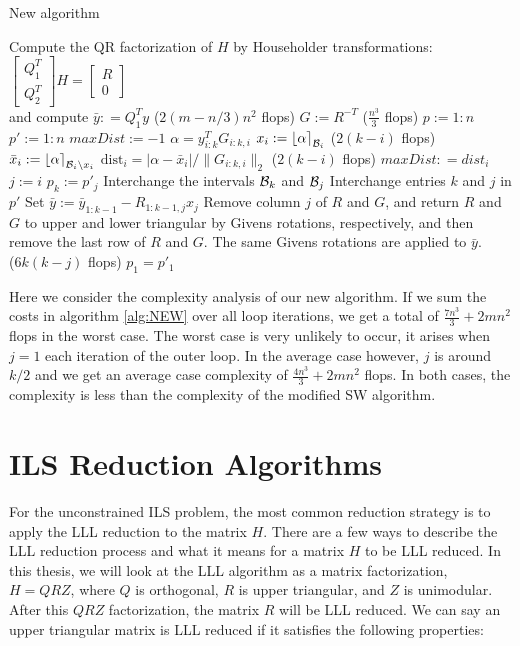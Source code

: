 \documentclass[12pt,Bold,letterpaper]{mcgilletdclass}
\newcommand{\bsmx}{\left[\begin{smallmatrix}}
\newcommand{\esmx}{\end{smallmatrix}\right]}
\newcommand{\dist}{\mathrm{dist}}
\begin{document}
\begin{algorithm}
\caption{New algorithm}
\label{alg:NEW}
\begin{algorithmic}[1]
\STATE  Compute the QR factorization of $H$ by Householder transformations: 
$\bsmx Q_1^T \\ Q_2^T \esmx H= \bsmx R\\ 0 \esmx$  \\
             and compute  $\bar{y} : = Q_1^Ty$ \hfill ($2(m-n/3)n^2$ flops)
\STATE $G := R^{-T}$ \hfill ($\frac{n^3}{3}$ flops)
\STATE $p := 1:n$
\STATE $p' := 1:n$
	\STATE $maxDist := -1$
	         \STATE $\alpha=y_{i:k}^TG_{i:k,i}$
	         \STATE $x_i := \left \lfloor \alpha \right \rceil_{{\cal B}_i}$ \hfill ($2(k-i)$ flops)
	         \STATE $\bar{x}_i := \left \lfloor \alpha \right \rceil_{{{\cal B}_i}\backslash x_i}$
	         \STATE $\dist_i =|\alpha-\bar{x}_i|/ \| G_{i:k,i} \|_2$ \hfill ($2(k-i)$ flops)
			 	\STATE $maxDist : = dist_i$
			 	\STATE $j:=i$
			 \ENDIF	
	\ENDFOR
	\STATE $p_k := p'_j$
	\STATE Interchange the intervals ${{\cal B}_k}$ and ${{\cal B}_j}$
	\STATE Interchange entries $k$ and $j$ in $p'$
	\STATE Set $\bar{y}:=\bar{y}_{1:k-1} - R_{1:k-1,j}x_j$	
	\STATE Remove column $j$ of $R$ and $G$, and return $R$ and $G$ to upper and lower triangular by Givens rotations, respectively, and then remove the last row of $R$ and $G$. The same Givens rotations are applied to $\bar{y}$. \\ \hfill ($6k(k-j)$ flops)
\ENDFOR
\STATE $p_1 = p'_1$
\end{algorithmic}
\end{algorithm}

Here we consider the complexity analysis of our new algorithm. 
If we sum the costs in algorithm \ref{alg:NEW} over all loop iterations,
we get a total of $\frac{7n^3}{3} + 2mn^2$ flops in the worst case. 
The worst case is very unlikely to occur, it arises when $j=1$ each iteration of the outer loop. In the average case
however, $j$ is around $k/2$ and we get an average case complexity of $\frac{4n^3}{3} + 2mn^2$ flops.
In both cases, the complexity is less than the complexity of the modified SW algorithm.

\section{ILS Reduction Algorithms}
For the unconstrained ILS problem, the most common reduction strategy is to apply the LLL reduction \cite{LenLL82} to the matrix $H$. There are a few ways to describe the LLL reduction process and what it means for a matrix $H$ to be LLL reduced. In this thesis, we will look at the LLL algorithm as a matrix factorization, $H = QRZ$, where $Q$ is orthogonal, $R$ is upper triangular, and $Z$ is unimodular. After this $QRZ$ factorization, the matrix $R$ will be LLL reduced. We can say an upper triangular matrix is LLL reduced if it satisfies the following properties:
\end{document}
